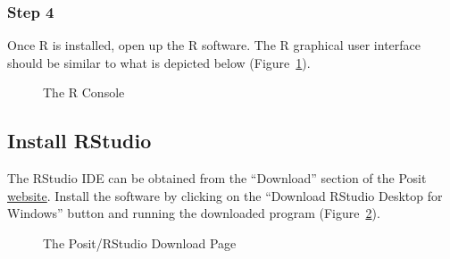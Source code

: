 \documentclass[
  letterpaper,
  DIV=11,
  numbers=noendperiod]{scrreprt}
\begin{document}
\subsubsection{Step 4}\label{step-4}

Once R is installed, open up the R software. The R graphical user
interface should be similar to what is depicted below
(Figure~\ref{fig-r-console-1}).

\begin{figure}


\caption{\label{fig-r-console-1}The R Console}

\end{figure}%

\subsection{Install RStudio}\label{install-rstudio}

The RStudio IDE can be obtained from the ``Download'' section of the
Posit \href{https://posit.co/download/rstudio-desktop/}{website}.
Install the software by clicking on the ``Download RStudio Desktop for
Windows'' button and running the downloaded program
(Figure~\ref{fig-rstudio-1}).

\begin{figure}


\caption{\label{fig-rstudio-1}The Posit/RStudio Download Page}

\end{figure}%
\end{document}
